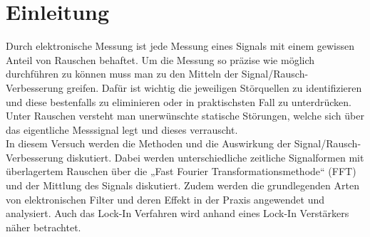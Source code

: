 
\chapter{Einleitung}
\label{chap:einleitung}

Durch elektronische Messung ist jede Messung eines Signals mit einem gewissen Anteil von Rauschen behaftet. Um die Messung so präzise wie möglich durchführen zu können muss man zu den Mitteln der Signal/Rausch-Verbesserung greifen. Dafür ist wichtig die jeweiligen Störquellen zu identifizieren und diese bestenfalls zu eliminieren oder in praktischsten Fall zu unterdrücken.\\

Unter Rauschen versteht man unerwünschte statische Störungen, welche sich über das eigentliche Messsignal legt und dieses verrauscht.\\

In diesem Versuch werden die Methoden und die Auswirkung der Signal/Rausch-Verbesserung diskutiert. Dabei werden unterschiedliche zeitliche Signalformen mit überlagertem Rauschen über die „Fast Fourier Transformationsmethode“ (FFT) und der Mittlung des Signals diskutiert. Zudem werden die grundlegenden Arten von elektronischen Filter und deren Effekt in der Praxis angewendet und analysiert. Auch das Lock-In Verfahren wird anhand eines Lock-In Verstärkers näher betrachtet.